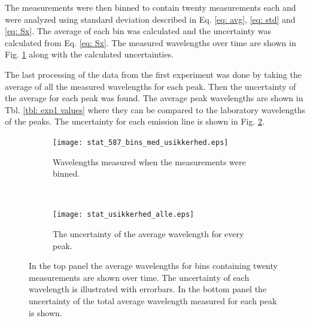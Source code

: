 The measurements were then binned to contain twenty measurements each and were analyzed using standard deviation described in Eq. \ref{eq: avg}, \ref{eq: std} and \ref{eq: Sx}. The average of each bin was calculated and the uncertainty was calculated from Eq. \ref{eq: Sx}. The measured wavelengths over time are shown in Fig. \ref{fig: exp1 bins} along with the calculated uncertainties.

The last processing of the data from the first experiment was done by taking the average of all the measured wavelengths for each peak. Then the uncertainty of the average for each peak was found. The average peak wavelengths are shown in Tbl. \ref{tbl: exp1 values} where they can be compared to the laboratory wavelengths of the peaks. The uncertainty for each emission line is shown in Fig. \ref{fig: exp1 usikkerhed peaks}.

\begin{figure}[!ht]
\centering
\begin{subfigure}{0.9\textwidth}
\centering
\texttt{[image: stat\_587\_bins\_med\_usikkerhed.eps]}
\caption{Wavelengths measured when the measurements were binned.}
\label{fig: exp1 bins}
\end{subfigure}
~
\begin{subfigure}{0.9\textwidth}
\centering
\texttt{[image: stat\_usikkerhed\_alle.eps]}
\caption{The uncertainty of the average wavelength for every peak.}
\label{fig: exp1 usikkerhed peaks}
\end{subfigure}
\caption{In the top panel the average wavelengths for bins containing twenty measurements are shown over time. The uncertainty of each wavelength is illustrated with errorbars. In the bottom panel the uncertainty of the total average wavelength measured for each peak is shown.}
\label{fig: exp1 samlet bins}
\end{figure}

